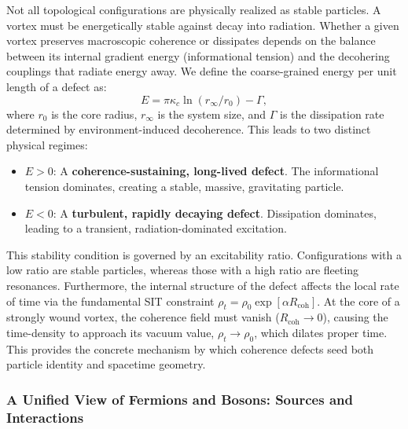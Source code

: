 \documentclass[american,11pt,letterpaper]{article}
\def\mathcal#1{#1}%
\begin{document}
Not all topological configurations are physically realized as stable particles. A vortex must be energetically stable against decay into radiation. Whether a given vortex preserves macroscopic coherence or dissipates depends on the balance between its internal gradient energy (informational tension) and the decohering couplings that radiate energy away. We define the coarse-grained energy per unit length of a defect as:
\begin{equation}
    \mathcal{E} = \pi\kappa_{c}\ln(r_{\infty}/r_{0}) - \Gamma,
\end{equation}
where $r_{0}$ is the core radius, $r_{\infty}$ is the system size, and $\Gamma$ is the dissipation rate determined by environment-induced decoherence. This leads to two distinct physical regimes:
\begin{itemize}
    \item $\mathcal{E} > 0$: A \textbf{coherence-sustaining, long-lived defect}. The informational tension dominates, creating a stable, massive, gravitating particle.
    \item $\mathcal{E} < 0$: A \textbf{turbulent, rapidly decaying defect}. Dissipation dominates, leading to a transient, radiation-dominated excitation.
\end{itemize}
This stability condition is governed by an excitability ratio. Configurations with a low ratio are stable particles, whereas those with a high ratio are fleeting resonances. Furthermore, the internal structure of the defect affects the local rate of time via the fundamental SIT constraint $\rho_{t} = \rho_{0}\exp[\alpha R_{\text{coh}}]$. At the core of a strongly wound vortex, the coherence field must vanish ($R_{\text{coh}} \rightarrow 0$), causing the time-density to approach its vacuum value, $\rho_{t} \rightarrow \rho_{0}$, which dilates proper time. This provides the concrete mechanism by which coherence defects seed both particle identity and spacetime geometry.

\subsubsection{A Unified View of Fermions and Bosons: Sources and Interactions}
\end{document}
